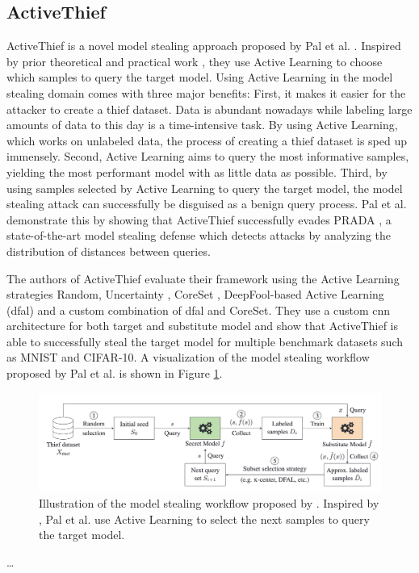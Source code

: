 \subsection{ActiveThief}
\label{sec:Related_work:Model_Stealing:ActiveThief}
ActiveThief is a novel model stealing approach proposed by Pal et al. \cite{pal2020activethief}. Inspired by prior theoretical \cite{chandrasekaran2020exploring}
and practical work \cite{shi2018active}, they use Active Learning to choose which samples to query the target model. Using Active Learning in the model stealing
domain comes with three major benefits: First, it makes it easier for the attacker to create a thief dataset. Data is abundant nowadays while labeling large amounts
of data to this day is a time-intensive task. By using Active Learning, which works on unlabeled data, the process of creating a thief dataset is sped up immensely.
Second, Active Learning aims to query the most informative samples, yielding the most performant model with as little data as possible. Third, by using samples selected
by Active Learning to query the target model, the model stealing attack can successfully be disguised as a benign query process. Pal et al. demonstrate this by showing 
that ActiveThief successfully evades PRADA \cite{juuti2019prada}, a state-of-the-art model stealing defense which detects attacks by analyzing the distribution of distances
between queries. \par
The authors of ActiveThief evaluate their framework using the Active Learning strategies Random, Uncertainty \cite{lewis1994sequential}, CoreSet \cite{sener2017active},
DeepFool-based Active Learning (\gls{dfal}) \cite{ducoffe2018adversarial} and a custom combination of \gls{dfal} and CoreSet. They use a custom \gls{cnn} architecture
for both target and substitute model and show that ActiveThief is able to successfully steal the target model for multiple benchmark datasets such as MNIST and CIFAR-10.
A visualization of the model stealing workflow proposed by Pal et al. is shown in Figure \ref{fig:ActiveThief}.

\begin{figure} [ht]
    \centering
    \includegraphics[width=.9\linewidth]{images/ActiveThief_Idea.png}
    \caption[Visualization of ActiveThief]{Illustration of the model stealing workflow proposed by \cite{pal2020activethief}. Inspired by
    \cite{chandrasekaran2020exploring}, Pal et al. use Active Learning to select the next samples to query the target model.}
    \label{fig:ActiveThief}
\end{figure}

\dots
